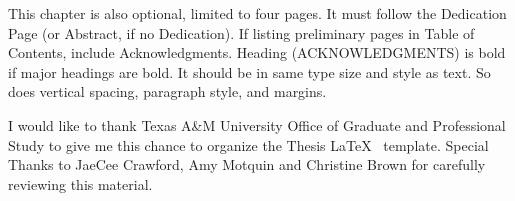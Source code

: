 \TAMUAcknowledgmentFormat
This chapter is also optional, limited to four pages. It must follow the Dedication Page (or Abstract, if no Dedication). If listing preliminary pages in Table of Contents, include Acknowledgments. Heading (\MakeUppercase{Acknowledgments}) is bold if major headings are bold. It should be in same type size and style as text. So does vertical spacing, paragraph style, and margins.

I would like to thank Texas A\&M University Office of Graduate and Professional Study to give me this chance to organize the Thesis \LaTeX ~ template. Special Thanks to JaeCee Crawford, Amy Motquin and Christine Brown for carefully reviewing this material.  %
